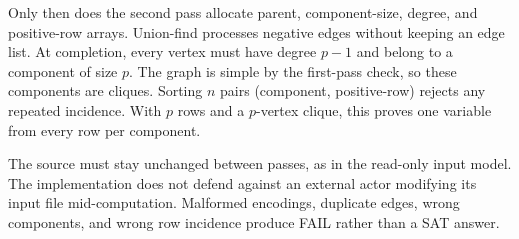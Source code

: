 \documentclass[11pt]{article}
\begin{document}
Only then does the second pass allocate parent, component-size, degree, and positive-row arrays. Union-find processes negative edges without keeping an edge list. At completion, every vertex must have degree $p-1$ and belong to a component of size $p$. The graph is simple by the first-pass check, so these components are cliques. Sorting $n$ pairs (component, positive-row) rejects any repeated incidence. With $p$ rows and a $p$-vertex clique, this proves one variable from every row per component.

The source must stay unchanged between passes, as in the read-only input model. The implementation does not defend against an external actor modifying its input file mid-computation. Malformed encodings, duplicate edges, wrong components, and wrong row incidence produce FAIL rather than a SAT answer.
\end{document}
